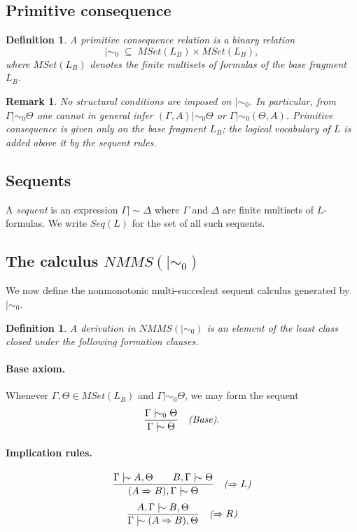 \documentclass[11pt]{article}
\newtheorem{definition}[theorem]{Definition}
\newtheorem{remark}[theorem]{Remark}
\newcommand{\ms}{\mathrel{\mid\!\sim}}
\newcommand{\mszero}{\mathrel{\mid\!\sim_{0}}}
\newcommand{\MSet}{\mathit{MSet}}
\newcommand{\NMMS}{\mathit{NMMS}}
\newcommand{\Seq}{\mathit{Seq}}
\begin{document}
\subsection{Primitive consequence}

\begin{definition}
A \emph{primitive consequence relation} is a binary relation
\[
\mszero \;\subseteq\; \MSet(L_B)\times \MSet(L_B),
\]
where \(\MSet(L_B)\) denotes the finite multisets of formulas of the base
fragment \(L_B\).
\end{definition}

\begin{remark}
No structural conditions are imposed on $\mszero$. In particular, from $\Gamma\mszero\Theta$ one cannot in general infer $(\Gamma,A)\mszero\Theta$ or $\Gamma\mszero(\Theta,A)$. Primitive consequence is given only on the base fragment $L_B$; the logical vocabulary of $L$ is added above it by the sequent rules.
\end{remark}

\subsection{Sequents}

A \emph{sequent} is an expression $\Gamma \ms \Delta$ where $\Gamma$ and $\Delta$ are finite multisets of $L$-formulas. We write $\Seq(L)$ for the set of all such sequents.


\subsection{The calculus \texorpdfstring{\(\NMMS(\mszero)\)}{NMMS}}

We now define the nonmonotonic multi-succedent sequent calculus generated by
\(\mszero\).

\begin{definition}
A \emph{derivation} in \(\NMMS(\mszero)\) is an element of the least class
closed under the following formation clauses.
\end{definition}

\paragraph{Base axiom.}
Whenever \(\Gamma,\Theta\in \MSet(L_B)\) and \(\Gamma \mszero \Theta\), we may
form the sequent
\[
\frac{\Gamma \mszero \Theta}{\Gamma \ms \Theta}
\quad \text{\emph{(Base)}}.
\]

\paragraph{Implication rules.}
\[
\frac{\Gamma \ms A,\Theta \qquad B,\Gamma \ms \Theta}
{(A\Rightarrow B),\Gamma \ms \Theta}
\quad \text{\emph{(\(\Rightarrow L\))}}
\]
\[
\frac{A,\Gamma \ms B,\Theta}
{\Gamma \ms (A\Rightarrow B),\Theta}
\quad \text{\emph{(\(\Rightarrow R\))}}
\]
\end{document}
